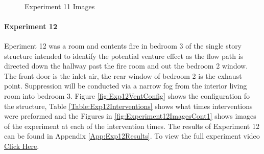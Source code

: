 \documentclass{article}
\begin{document}
\begin{figure}[H]
	\ContinuedFloat 
	\centering 
	 \ 
	 \ 
	\caption{Experiment 11 Images}
	\label{fig:Experiment11ImagesCont3} 
\end{figure}

\paragraph{Experiment 12}\mbox{}

Eperiment 12 was a room and contents fire in bedroom 3 of the single story structure intended to identify the potential venture effect as the flow path is directed down the hallway past the fire room and out the bedroom 2 window. The front door is the inlet air, the rear window of bedroom 2 is the exhaust point. Suppression will be conducted via a narrow fog from the interior living room into bedroom 3. Figure \ref{fig:Exp12VentConfig} shows the configuration fo the structure, Table \ref{Table:Exp12Interventions} shows what times interventions were preformed and the Figures in \ref{fig:Experiment12ImagesCont1} shows images of the experiment at each of the intervention times. The results of Experiment 12 can be found in Appendix \ref{App:Exp12Results}. To view the full experiment video \href{https://youtu.be/4ROh9dXBXM0}{Click Here}.
\end{document}
